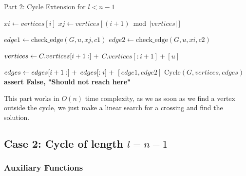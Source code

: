 \begin{algorithm}[H]
    \caption{Part 2: Cycle Extension for \( l < n - 1 \)}
    \begin{algorithmic}
                        \State $xi \gets vertices[i]$
                        \State $xj \gets vertices[(i + 1) \bmod |vertices|]$

                        \State $edge1 \gets \text{check\_edge}(G, u, xj, c1)$
                        \State $edge2 \gets \text{check\_edge}(G, u, xi, c2)$
                        
                            \State $vertices \gets C.vertices[i + 1:] \hspace{0.3em} +$
                            \State \hspace{2.5em} $C.vertices[:i + 1] + [u]$

                            \State $edges \gets edges[i + 1:] \hspace{0.3em} +$
                            \State \hspace{2.5em} $edges[:i] \hspace{0.3em} +$
                            \State \hspace{2.5em} $[edge1, edge2]$
                            \State \Return $\text{Cycle}(G, vertices, edges)$
                        \EndIf
                    \EndFor
                \EndIf
            \EndFor
            \State \textbf{assert False, "Should not reach here"}
        \EndFunction
    \end{algorithmic}
\end{algorithm}

This part works in $O(n)$ time complexity, as we as soon as we find a vertex outside the cycle,
we just make a linear search for a crossing and find the solution.

\subsection{Case 2: Cycle of length $l = n - 1$}

\subsubsection{Auxiliary Functions}

